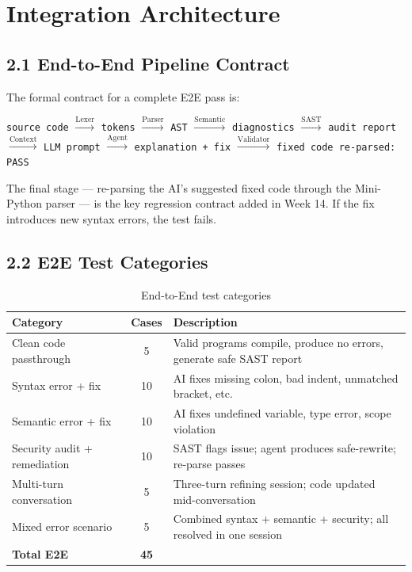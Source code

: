 \documentclass[a4paper,11pt]{article}
\begin{document}
\section{Integration Architecture}

\subsection{2.1 End-to-End Pipeline Contract}

The formal contract for a complete E2E pass is:

\begin{center}
\texttt{source code} $\xrightarrow{\text{Lexer}}$ \texttt{tokens}
$\xrightarrow{\text{Parser}}$ \texttt{AST}
$\xrightarrow{\text{Semantic}}$ \texttt{diagnostics}
$\xrightarrow{\text{SAST}}$ \texttt{audit report}
$\xrightarrow{\text{Context}}$ \texttt{LLM prompt}
$\xrightarrow{\text{Agent}}$ \texttt{explanation + fix}
$\xrightarrow{\text{Validator}}$ \texttt{fixed code re-parsed: PASS}
\end{center}

The final stage --- re-parsing the AI's suggested fixed code through the Mini-Python parser --- is the key regression contract added in Week 14. If the fix introduces new syntax errors, the test fails.

\subsection{2.2 E2E Test Categories}

\begin{table}[h]
\centering
\begin{tabularx}{\textwidth}{|l|c|X|}
\hline
\rowcolor{orange!10}
\textbf{Category} & \textbf{Cases} & \textbf{Description} \\
\hline
Clean code passthrough & 5 & Valid programs compile, produce no errors, generate safe SAST report \\
\hline
Syntax error + fix & 10 & AI fixes missing colon, bad indent, unmatched bracket, etc. \\
\hline
Semantic error + fix & 10 & AI fixes undefined variable, type error, scope violation \\
\hline
Security audit + remediation & 10 & SAST flags issue; agent produces safe-rewrite; re-parse passes \\
\hline
Multi-turn conversation & 5 & Three-turn refining session; code updated mid-conversation \\
\hline
Mixed error scenario & 5 & Combined syntax + semantic + security; all resolved in one session \\
\hline
\textbf{Total E2E} & \textbf{45} & \\
\hline
\end{tabularx}
\caption{End-to-End test categories}
\end{table}
\end{document}
